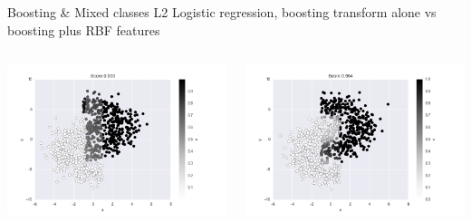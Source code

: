 \documentclass[11pt]{beamer}
\begin{document}
\begin{frame}{Boosting \& Mixed classes}
L2 Logistic regression, boosting transform alone vs boosting plus RBF features
\begin{columns}
\includegraphics[scale=0.3]{boosting_only.png} 

\includegraphics[scale=0.3]{boosting_nys_labels.png} 
\end{columns}

\end{frame}
\end{document}
